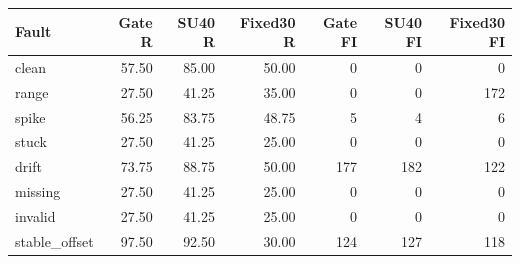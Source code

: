 \setlength{\tabcolsep}{3pt}\begin{tabular}{lrrrrrr}\toprule
Fault & Gate R & SU40 R & Fixed30 R & Gate FI & SU40 FI & Fixed30 FI \\\midrule
clean & 57.50 & 85.00 & 50.00 & 0 & 0 & 0 \\
range & 27.50 & 41.25 & 35.00 & 0 & 0 & 172 \\
spike & 56.25 & 83.75 & 48.75 & 5 & 4 & 6 \\
stuck & 27.50 & 41.25 & 25.00 & 0 & 0 & 0 \\
drift & 73.75 & 88.75 & 50.00 & 177 & 182 & 122 \\
missing & 27.50 & 41.25 & 25.00 & 0 & 0 & 0 \\
invalid & 27.50 & 41.25 & 25.00 & 0 & 0 & 0 \\
stable\_offset & 97.50 & 92.50 & 30.00 & 124 & 127 & 118 \\
\bottomrule\end{tabular}
